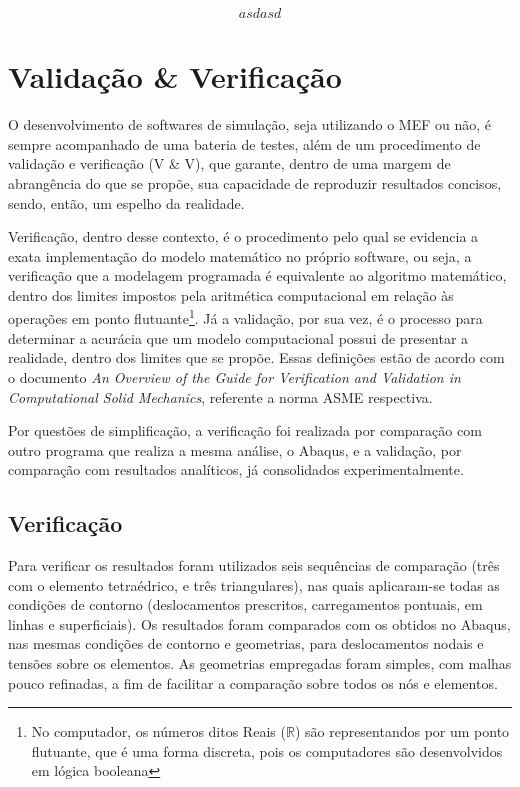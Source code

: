 

$$ asdasd $$
\chapter{Validação \& Verificação}


O desenvolvimento de softwares de simulação, seja utilizando o MEF ou não, é sempre acompanhado de uma bateria de testes, além de um procedimento de validação e verificação (V \& V), que garante, dentro de uma margem de abrangência do que se propõe, sua capacidade de reproduzir resultados concisos, sendo, então, um espelho da realidade.

Verificação, dentro desse contexto, é o procedimento pelo qual se evidencia a exata implementação do modelo matemático no próprio software, ou seja, a verificação que a modelagem programada é equivalente ao algoritmo matemático, dentro dos limites impostos pela aritmética computacional em relação às operações em ponto flutuante\footnote{No computador, os números ditos Reais ($\mathbb{R}$) são representandos por um ponto flutuante, que é uma forma discreta, pois os computadores são desenvolvidos em lógica booleana}. Já a validação, por sua vez, é o processo para determinar a acurácia que um modelo computacional possui de presentar a realidade, dentro dos limites que se propõe. Essas definições estão de acordo com o documento \emph{An Overview of the Guide for Verification and Validation
in Computational Solid Mechanics}, referente a norma ASME respectiva.

Por questões de simplificação, a verificação foi realizada por comparação com outro programa que realiza a mesma análise, o Abaqus, e a validação, por comparação com resultados analíticos, já consolidados experimentalmente.

\section{Verificação}

Para verificar os resultados foram utilizados seis sequências de comparação (três com o elemento tetraédrico, e três triangulares), nas quais aplicaram-se todas as condições de contorno (deslocamentos prescritos, carregamentos pontuais, em linhas e superficiais). Os resultados foram comparados com os obtidos no Abaqus, nas mesmas condições de contorno e geometrias, para deslocamentos nodais e tensões sobre os elementos. As geometrias empregadas foram simples, com malhas pouco refinadas, a fim de facilitar a comparação sobre todos os nós e elementos.

